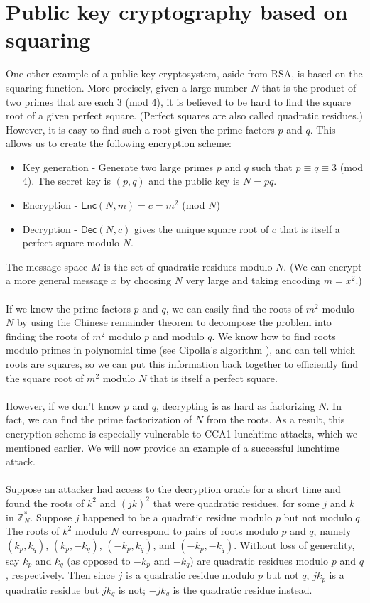 \documentclass[10pt]{article}
\begin{document}
\section{Public key cryptography based on squaring}
One other example of a public key cryptosystem, aside from RSA, is based on the squaring function.  More precisely, given a large number $ N $ that is the product of two primes that are each 3 (mod 4), it is believed to be hard to find the square root of a given perfect square. (Perfect squares are also called quadratic residues.)  However, it is easy to find such a root given the prime factors $ p $ and $ q $.  This allows us to create the following encryption scheme:
\begin{itemize}
\item Key generation - Generate two large primes $ p $ and $ q $ such that $ p \equiv q \equiv 3 $ (mod 4).  The secret key is $ (p,q) $ and the public key is $ N = pq $.
\item Encryption - $ \mathsf{Enc}(N, m) = c = m^2 $ (mod $ N $)
\item Decryption - $ \mathsf{Dec}(N, c) $ gives the unique square root of $ c $ that is itself a perfect square modulo $ N $.
\end{itemize}
The message space $ M $ is the set of quadratic residues modulo $ N $.  (We can encrypt a more general message $ x $ by choosing $ N $ very large and taking encoding $ m = x^2 $.)
\\ ~ \\
If we know the prime factors $ p $ and $ q $, we can easily find the roots of $ m^2 $ modulo $ N $ by using the Chinese remainder theorem to decompose the problem into finding the roots of $ m^2 $ modulo $ p $ and modulo $ q $.  We know how to find roots modulo primes in polynomial time (see Cipolla's algorithm \cite{Cip}), and can tell which roots are squares, so we can put this information back together to efficiently find the square root of $ m^2 $ modulo $ N $ that is itself a perfect square.
\\ ~ \\
However, if we don't know $ p $ and $ q $, decrypting is as hard as factorizing $ N $.  In fact, we can find the prime factorization of $ N $ from the roots.  As a result, this encryption scheme is especially vulnerable to CCA1 lunchtime attacks, which we mentioned earlier.  We will now provide an example of a successful lunchtime attack.
\\ ~ \\
Suppose an attacker had access to the decryption oracle for a short time and found the roots of $ k^2 $ and $ (jk)^2 $ that were quadratic residues, for some $ j $ and $ k $ in $ \mathbb{Z}_N^\ast $.  Suppose $ j $ happened to be a quadratic residue modulo $ p $ but not modulo $ q $.  The roots of $ k^2 $ modulo $ N $ correspond to pairs of roots modulo $ p $ and $ q $, namely $ (k_p, k_q) $, $ (k_p, -k_q) $, $ (-k_p, k_q) $, and $ (-k_p, -k_q) $.  Without loss of generality, say $ k_p $ and $ k_q $ (as opposed to $ -k_p $ and $ -k_q $) are quadratic residues modulo $ p $ and $ q $, respectively.  Then since $ j $ is a quadratic residue modulo $ p $ but not $ q $, $ jk_p $ is a quadratic residue but $ jk_q $ is not; $ -jk_q $ is the quadratic residue instead.
\end{document}
